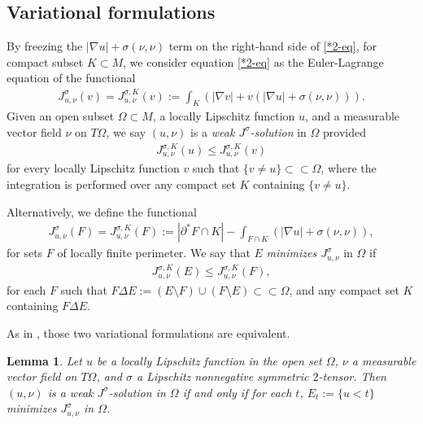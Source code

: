\documentclass[11pt, letterpaper]{amsart}
\newtheorem{lem}[thm]{Lemma}
\theoremstyle{definition}
\theoremstyle{remark}
\begin{document}
\subsection{Variational formulations}


By freezing the $|\nabla u| + \sigma (\nu ,\nu )$ term on the right-hand side of \ref{*2-eq}, for compact subset $K \subset M$, we consider equation \ref{*2-eq} as the Euler-Lagrange equation of the functional
\begin{align*}
	J_{u, \nu }^{\sigma }(v) = J_{u, \nu }^{\sigma ,K}(v) := \int_{K}\left( |\nabla v| + v (|\nabla u| + \sigma (\nu ,\nu )) \right).
\end{align*} 
Given an open subset $\Omega \subset M$, a locally Lipschitz function $u$,  and a measurable vector field $\nu $ on $T\Omega $, we say $(u, \nu )$ is a \textit{weak $J^{\sigma }$-solution} in $\Omega $ provided 
\begin{align}\label{weak-J}
	J_{u, \nu }^{\sigma ,K}(u) \leq J_{u, \nu }^{\sigma ,K}(v)
\end{align}
for every locally Lipschitz function $v$ such that $\{ v \neq u\} \subset \subset \Omega $, where the integration is performed over any compact set $K$ containing $\{v \neq u\} $.

Alternatively, we define the functional
\begin{align*}
	J_{u, \nu }^{\sigma }(F) = J_{u, \nu }^{\sigma ,K}(F):= |\partial ^* F \cap K| - \int_{F \cap K} \left( |\nabla u| + \sigma (\nu ,\nu ) \right) ,
\end{align*} 
for sets $F$ of locally finite perimeter. We say that $E$ \textit{minimizes $J_{u, \nu }^{\sigma }$} in $\Omega $ if 
\begin{align}\label{mini-J}
	J_{u, \nu }^{\sigma ,K}(E) \leq J^{\sigma ,K}_{u, \nu }(F),
\end{align}
for each $F$ such that $F \Delta E:= (E \setminus F) \cup (F \setminus E) \subset \subset \Omega $, and any compact set $K$ containing $F \Delta E$.

As in \cite[Lemma 1.1]{HI01}, those two variational formulations are equivalent.
\begin{lem}\label{equivalent-J-E}
	Let $u$ be a locally Lipschitz function in the open set $\Omega $, $\nu $ a measurable vector field on $T \Omega $, and $\sigma $ a Lipschitz nonnegative symmetric $2$-tensor. Then $(u, \nu )$ is a weak $J ^{\sigma }$-solution in $\Omega $ if and only if for each $t$, $E_t:= \{ u< t\} $ minimizes $J_{u, \nu }^{\sigma }$ in $\Omega $.
\end{lem}
\end{document}
